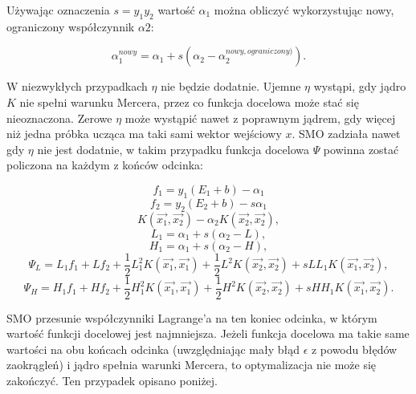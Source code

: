 \documentclass[[10pt,a4paper]{article}
\begin{document}
Używając oznaczenia $s=y_1 y_2$ wartość $\alpha_1$ można obliczyć wykorzystując nowy, ograniczony współczynnik $\alpha2$:

\begin{equation}
\alpha_1^{nowy} = \alpha_1 + s(\alpha_2 - \alpha_2^{nowy, ograniczony)}).
\end{equation}

W niezwykłych przypadkach $\eta$ nie będzie dodatnie. Ujemne $\eta$ wystąpi, gdy jądro $K$ nie spełni warunku Mercera, przez co funkcja docelowa może stać się nieoznaczona. Zerowe $\eta$ może wystąpić nawet z poprawnym jądrem, gdy więcej niż jedna próbka ucząca ma taki sami wektor wejściowy $x$. SMO zadziała nawet gdy $\eta$ nie jest dodatnie, w takim przypadku funkcja docelowa $\Psi$ powinna zostać policzona na każdym z końców odcinka:


\begin{equation}
f_1 = y_1(E_1+b) - \alpha_1 
\end{equation}
\begin{equation}
f_2 = y_2(E_2+b) - s\alpha_1
\end{equation}
\begin{equation}
K(\overrightarrow{x_1}, \overrightarrow{x_2}) - \alpha_2 K(\overrightarrow{x_2},\overrightarrow{x_2}),
\end{equation}
\begin{equation}
L_1 = \alpha_1 + s(\alpha_2 - L),
\end{equation}
\begin{equation}
H_1 = \alpha_1 + s(\alpha_2 - H),
\end{equation}
\begin{equation}
\Psi_L = L_1 f_1 + Lf_2 + \frac{1}{2}L_1^2 K(\overrightarrow{x_1},\overrightarrow{x_1}) + \frac{1}{2}L^2 K(\overrightarrow{x_2},\overrightarrow{x_2}) + sLL_1 K(\overrightarrow{x_1},\overrightarrow{x_2}), 
\end{equation}
\begin{equation}
\Psi_H = H_1 f_1 + Hf_2 + \frac{1}{2}H_1^2 K(\overrightarrow{x_1},\overrightarrow{x_1}) + \frac{1}{2}H^2 K(\overrightarrow{x_2},\overrightarrow{x_2}) + sHH_1 K(\overrightarrow{x_1},\overrightarrow{x_2}).
\end{equation}


SMO przesunie współczynniki Lagrange'a na ten koniec odcinka, w którym wartość funkcji docelowej jest najmniejsza. Jeżeli funkcja docelowa ma takie same wartości na obu końcach odcinka (uwzględniając mały błąd $\epsilon$ z powodu błędów zaokrągleń) i jądro spełnia warunki Mercera, to optymalizacja nie może się zakończyć. Ten przypadek opisano poniżej.
\end{document}
